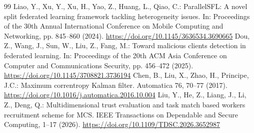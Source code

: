 \documentclass[runningheads,orivec]{llncs}
\begin{document}
\begin{thebibliography}{99}
     Liao, Y., Xu, Y., Xu, H., Yao, Z., Huang, L., Qiao, C.: ParallelSFL: A novel split federated learning framework tackling heterogeneity issues. In: Proceedings of the 30th Annual International Conference on Mobile Computing and Networking, pp. 845--860 (2024). \url{https://doi.org/10.1145/3636534.3690665}
     Dou, Z., Wang, J., Sun, W., Liu, Z., Fang, M.: Toward malicious clients detection in federated learning. In: Proceedings of the 20th ACM Asia Conference on Computer and Communications Security, pp. 456--472 (2025). \url{https://doi.org/10.1145/3708821.3736194}
     Chen, B., Liu, X., Zhao, H., Principe, J.C.: Maximum correntropy Kalman filter. Automatica 76, 70--77 (2017). \url{https://doi.org/10.1016/j.automatica.2016.10.004}
     Liu, Y., He, Z., Liang, J., Li, Z., Deng, Q.: Multidimensional trust evaluation and task match based workers recruitment scheme for MCS. IEEE Transactions on Dependable and Secure Computing, 1--17 (2026). \url{https://doi.org/10.1109/TDSC.2026.3652987}

\end{thebibliography}
\endgroup
\end{document}
